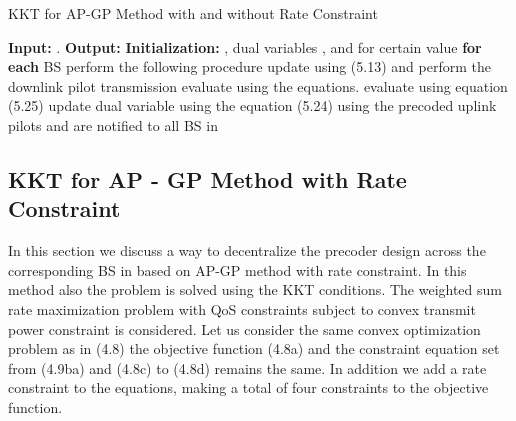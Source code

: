 \begin{algorithm}
	\caption[Distributed Precoder Design]{KKT for AP-GP Method with and without Rate Constraint}
	\label{algo-2}
	\begin{algorithmic}
		\label{algo--2}
		\STATE \textbf{Input:} .
		\STATE \textbf{Output:} 
		\STATE \textbf{Initialization:}  , dual variables	, and  for certain value
		\REPEAT
		\STATE \textbf{for each} \ac{BS}  perform the following procedure
		\STATE update  using (5.13) and perform the downlink pilot transmission
		\STATE evaluate  using the equations. 
		\STATE evaluate  using equation (5.25)
		\STATE update dual variable  using the equation (5.24)
		\ENDIF
		\STATE using the precoded uplink pilots  and  are notified to all \ac{BS} in 
		\\
	\end{algorithmic} 
\end{algorithm}


\subsection{KKT for AP - GP Method with Rate Constraint}

In this section we discuss a way to decentralize the precoder design across the corresponding \ac{BS} in  based on AP-GP method with rate constraint. In this method also the problem is solved using the \ac{KKT} conditions. The weighted sum rate maximization problem with \ac{QoS} constraints subject to convex transmit power constraint  is considered. Let us consider the same convex optimization problem as in (4.8) the objective function (4.8a) and the constraint equation set from (4.9ba) and (4.8c) to (4.8d) remains the same. In addition we add a rate constraint to the equations, making a total of four constraints to the objective function.

